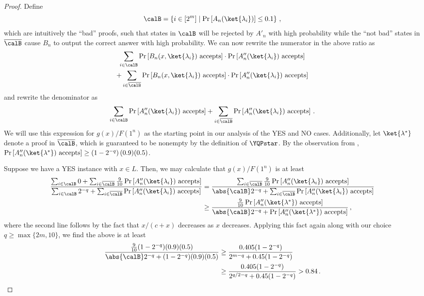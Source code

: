 \documentclass{toc}
\begin{document}
\begin{proof}
	Define
	\[
	\calB = \left\{ i\in[2^m] \mid \Pr\left[A_n(\ket{\lambda_i})\right]
	\leq 0.1 \right\} \, ,
	\]
	which are intuitively the ``bad'' proofs, such that states in $\calB$ will be rejected
	by $A'_n$ with high probability while the ``not bad'' states in $\overline{\calB}$
	cause $B_n$ to output the correct answer with high probability.
%
%
%
%
%
%
%
%
%
%
%
%
%
%
%
%
%
%
%
%
%
%
%
%
%
%
%
%
%
	We can now rewrite the numerator in the above ratio as
	\begin{multline*}
		\sum_{i\in \calB}
		\Pr\left[B_n(x,\ket{\lambda_i})\text{ accepts}\right]
		\cdot \Pr\left[A''_n(\ket{\lambda_i})\text{ accepts}\right] 
		\\ + 
		\sum_{i\in\overline{\calB}} 
		\Pr\left[B_n(x,\ket{\lambda_i})\text{ accepts}\right]
		\cdot \Pr\left[A''_n(\ket{\lambda_i})\text{ accepts}\right] 
	\end{multline*}
	and rewrite the denominator as
	\[
		\sum_{i\in \calB} \Pr\left[A''_n(\ket{\lambda_i})\text{ accepts}\right]
		+ \sum_{i\in\overline{\calB}} \Pr\left[A''_n(\ket{\lambda_i})\text{ accepts}\right]
		\, .
	\]
	We will use this expression for $g(x)/F(1^n)$ as the starting point in our analysis of the
	YES and NO cases.
	Additionally, let $\ket{\lambda^*}$ denote a proof in $\overline{\calB}$,
	which is guaranteed to be nonempty by the definition of $\YQPstar$.
	By the observation from ,
	$\Pr\left[A''_n(\ket{\lambda^*})\text{ accepts}\right] \geq \left(1-2^{-q}\right) (0.9)(0.5)$.
%
	
	Suppose we have a YES instance with $x\in L$.
	Then, we may calculate that $g(x)/F(1^n)$ is at least
	\begin{align*}
		\frac{
			\sum_{i\in \calB} 0
			+ \sum_{i\in\overline{\calB}} \frac{9}{10}
			\Pr\left[A''_n(\ket{\lambda_i})\text{ accepts}\right]
		}
		{
			\sum_{i\in \calB} 2^{-q}
			+ \sum_{i\in\overline{\calB}}
			\Pr\left[A''_n(\ket{\lambda_i})\text{ accepts}\right]
		}
		&= \frac{
			\sum_{i\in\overline{\calB}} \frac{9}{10}
			\Pr\left[A''_n(\ket{\lambda_i})\text{ accepts}\right]
		}
		{
			\abs{\calB} 2^{-q}
			+ \sum_{i\in\overline{\calB}} \Pr\left[A''_n(\ket{\lambda_i})\text{ accepts}\right]
		} \\
		&\geq \frac{\frac{9}{10} \Pr\left[A''_n(\ket{\lambda^*})\text{ accepts}\right]}
		{ \abs{\calB} 2^{-q} + \Pr\left[A''_n(\ket{\lambda^*})\text{ accepts}\right]} \, ,
	\end{align*}
	where the second line follows by the fact that $x/(c+x)$ decreases as $x$ decreases.
	Applying this fact again along with our choice $q\geq\max\{2m,10\}$, we find
	the above is at least
	\begin{align*}
		\frac{\frac{9}{10}(1-2^{-q}) (0.9)(0.5) }
		{\abs{\calB}2^{-q} + (1-2^{-q}) (0.9)(0.5)}
		&\geq \frac{ 0.405 (1-2^{-q}) }{2^{m-q} + 0.45(1-2^{-q}) } \\
		&\geq \frac{0.405(1-2^{-q}) }{2^{q/2-q} + 0.45(1-2^{-q}) } > 0.84 \, .
	\end{align*}
	

\end{proof}
\end{document}
